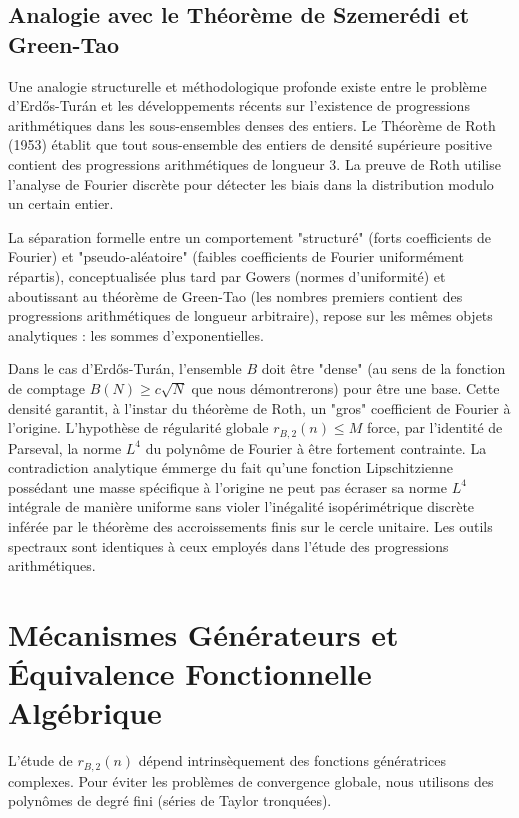 \documentclass[12pt,a4paper]{article}
\begin{document}
\subsection{Analogie avec le Th\'eor\`eme de Szemer\'edi et Green-Tao}

Une analogie structurelle et m\'ethodologique profonde existe entre le probl\`eme d'Erd\H{o}s-Tur\'an et les d\'eveloppements r\'ecents sur l'existence de progressions arithm\'etiques dans les sous-ensembles denses des entiers. Le Th\'eor\`eme de Roth (1953) \'etablit que tout sous-ensemble des entiers de densit\'e sup\'erieure positive contient des progressions arithm\'etiques de longueur 3. La preuve de Roth utilise l'analyse de Fourier discr\`ete pour d\'etecter les biais dans la distribution modulo un certain entier.

La s\'eparation formelle entre un comportement "structur\'e" (forts coefficients de Fourier) et "pseudo-al\'eatoire" (faibles coefficients de Fourier uniform\'ement r\'epartis), conceptualis\'ee plus tard par Gowers (normes d'uniformit\'e) et aboutissant au th\'eor\`eme de Green-Tao (les nombres premiers contient des progressions arithm\'etiques de longueur arbitraire), repose sur les m\^emes objets analytiques : les sommes d'exponentielles.

Dans le cas d'Erd\H{o}s-Tur\'an, l'ensemble $B$ doit \^etre "dense" (au sens de la fonction de comptage $B(N) \ge c \sqrt{N}$ que nous d\'emontrerons) pour \^etre une base. Cette densit\'e garantit, \`a l'instar du th\'eor\`eme de Roth, un "gros" coefficient de Fourier \`a l'origine. L'hypoth\`ese de r\'egularit\'e globale $r_{B,2}(n) \le M$ force, par l'identit\'e de Parseval, la norme $L^4$ du polyn\^ome de Fourier \`a \^etre fortement contrainte. La contradiction analytique \'emmerge du fait qu'une fonction Lipschitzienne poss\'edant une masse sp\'ecifique \`a l'origine ne peut pas \'ecraser sa norme $L^4$ int\'egrale de mani\`ere uniforme sans violer l'in\'egalit\'e isop\'erim\'etrique discr\`ete inf\'er\'ee par le th\'eor\`eme des accroissements finis sur le cercle unitaire. Les outils spectraux sont identiques \`a ceux employ\'es dans l'\'etude des progressions arithm\'etiques.

\section{M\'ecanismes G\'en\'erateurs et \'Equivalence Fonctionnelle Alg\'ebrique}

L'\'etude de $r_{B,2}(n)$ d\'epend intrins\`equement des fonctions g\'en\'eratrices complexes. Pour \'eviter les probl\`emes de convergence globale, nous utilisons des polyn\^omes de degr\'e fini (s\'eries de Taylor tronqu\'ees).
\end{document}
